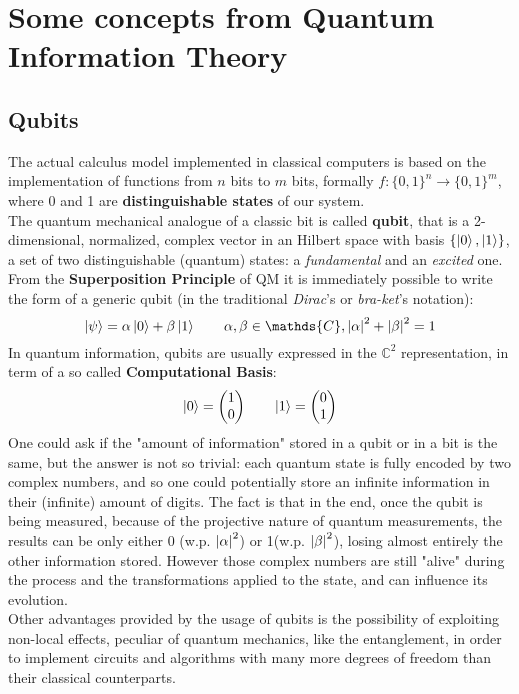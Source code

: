 \section{Some concepts from Quantum Information Theory \cite{Manzali}}

\subsection{Qubits}
The actual calculus model implemented in classical computers is based on the implementation of functions from $n$ bits to $m$ bits, formally $f:\{0,1\}^n\to\{0,1\}^m$, where 0 and 1 are \textbf{distinguishable states} of our system.\\
The quantum mechanical analogue of a classic bit is called \textbf{qubit}, that is a 2-dimensional, normalized, complex vector in an Hilbert space with basis $\{\ket{0},\ket{1}\}$, a set of two distinguishable (quantum) states: a \textit{fundamental} and an \textit{excited} one. From the \textbf{Superposition Principle} of QM it is immediately possible to write the form of a generic qubit (in the traditional \textit{Dirac}'s or \textit{bra-ket}'s notation):
\[ \ket{\psi} = \alpha\ket{0}+\beta\ket{1} \qquad \alpha,\beta\in\mathds{C}, \abs{\alpha}^2+\abs{\beta}^2=1 \]
In quantum information, qubits are usually expressed in the $\mathds{C}^2$ representation, in term of a so called \textbf{Computational Basis}:
\[ \ket{0} = \begin{pmatrix}1\\0\end{pmatrix} \qquad \ket{1} = \begin{pmatrix}0\\1\end{pmatrix} \] 
One could ask if the "amount of information" stored in a qubit or in a bit is the same, but the answer is not so trivial: each quantum state is fully encoded by two complex numbers, and so one could potentially store an infinite information in their (infinite) amount of digits. The fact is that in the end, once the qubit is being measured, because of the projective nature of quantum measurements, the results can be only either 0 (w.p. $\abs{\alpha}^2$) or 1(w.p. $\abs{\beta}^2$), losing almost entirely the other information stored. However those complex numbers are still "alive" during the process and the transformations applied to the state, and can influence its evolution.\\
Other advantages provided by the usage of qubits is the possibility of exploiting non-local effects, peculiar of quantum mechanics, like the entanglement, in order to implement circuits and algorithms with many more degrees of freedom than their classical counterparts.\\

